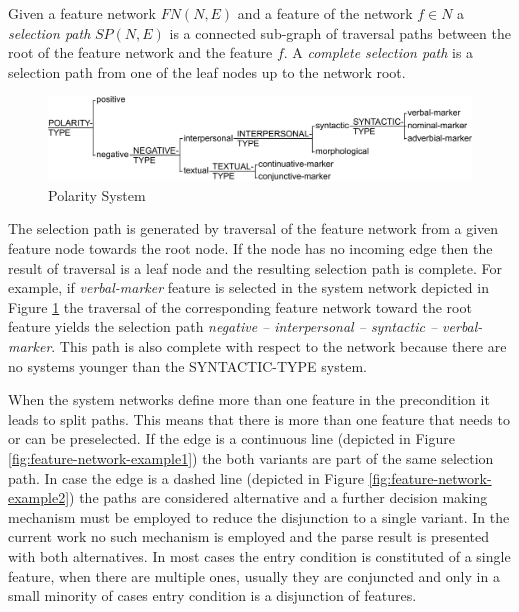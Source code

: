 
    Given a feature network $FN(N,E)$ and a feature of the network $f \in N$ a \textit{selection path} $SP(N,E)$ is a connected sub-graph of traversal paths between the root of the feature network and the feature $f$. A \textit{complete selection path} is a selection path from one of the leaf nodes up to the network root. 

    \begin{figure}[!ht]
        \centering
        \includegraphics[width=\textwidth]{Figures/SFL-grammar/polarity-system.pdf}
        \caption{Polarity System}
        \label{fig:polarity1}
    \end{figure}

    The selection path is generated by traversal of the feature network from a given feature node towards the root node. If the node has no incoming edge then the result of traversal is a leaf node and the resulting selection path is complete. For example, if \textit{verbal-marker} feature is selected in the system network depicted in Figure \ref{fig:polarity1} the traversal of the corresponding feature network toward the root feature yields the selection path \textit{negative -- interpersonal -- syntactic -- verbal-marker}. This path is also complete with respect to the network because there are no systems younger than the SYNTACTIC-TYPE system.

    When the system networks define more than one feature in the precondition it leads to split paths. This means that there is more than one feature that needs to or can be preselected. If the edge is a continuous line (depicted  in Figure \ref{fig:feature-network-example1}) the both variants are part of the same selection path. In case the edge is a dashed line (depicted  in Figure \ref{fig:feature-network-example2}) the paths are considered alternative and a further decision making mechanism must be employed to reduce the disjunction to a single variant. In the current work no such mechanism is employed and the parse result is presented with both alternatives. In most cases the entry condition is constituted of a single feature, when there are multiple ones, usually they are conjuncted and only in a small minority of cases entry condition is a disjunction of features.

